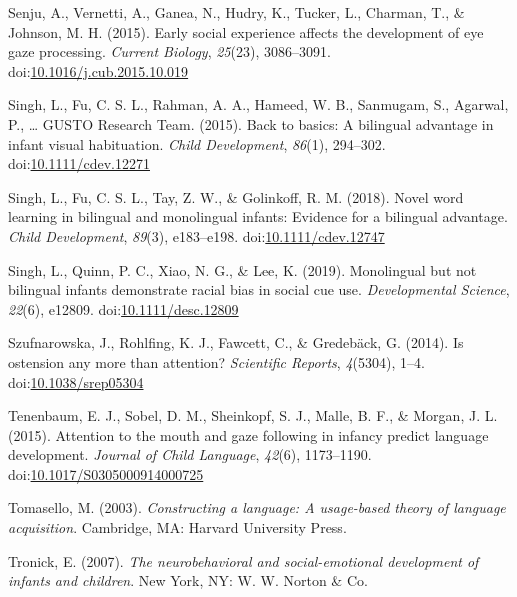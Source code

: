 \documentclass[,man,floatsintext]{apa6}
\begin{document}
\leavevmode\hypertarget{ref-Senju_etal_2015}{}%
Senju, A., Vernetti, A., Ganea, N., Hudry, K., Tucker, L., Charman, T., \& Johnson, M. H. (2015). Early social experience affects the development of eye gaze processing. \emph{Current Biology}, \emph{25}(23), 3086--3091. doi:\href{https://doi.org/10.1016/j.cub.2015.10.019}{10.1016/j.cub.2015.10.019}

\leavevmode\hypertarget{ref-Singh_etal_2015}{}%
Singh, L., Fu, C. S. L., Rahman, A. A., Hameed, W. B., Sanmugam, S., Agarwal, P., \ldots{} GUSTO Research Team. (2015). Back to basics: A bilingual advantage in infant visual habituation. \emph{Child Development}, \emph{86}(1), 294--302. doi:\href{https://doi.org/10.1111/cdev.12271}{10.1111/cdev.12271}

\leavevmode\hypertarget{ref-Singh_etal_2018}{}%
Singh, L., Fu, C. S. L., Tay, Z. W., \& Golinkoff, R. M. (2018). Novel word learning in bilingual and monolingual infants: Evidence for a bilingual advantage. \emph{Child Development}, \emph{89}(3), e183--e198. doi:\href{https://doi.org/10.1111/cdev.12747}{10.1111/cdev.12747}

\leavevmode\hypertarget{ref-Singh_etal_2019}{}%
Singh, L., Quinn, P. C., Xiao, N. G., \& Lee, K. (2019). Monolingual but not bilingual infants demonstrate racial bias in social cue use. \emph{Developmental Science}, \emph{22}(6), e12809. doi:\href{https://doi.org/10.1111/desc.12809}{10.1111/desc.12809}

\leavevmode\hypertarget{ref-Szufnarowska_etal_2014}{}%
Szufnarowska, J., Rohlfing, K. J., Fawcett, C., \& Gredebäck, G. (2014). Is ostension any more than attention? \emph{Scientific Reports}, \emph{4}(5304), 1--4. doi:\href{https://doi.org/10.1038/srep05304}{10.1038/srep05304}

\leavevmode\hypertarget{ref-Tenenbaum_etal_2015}{}%
Tenenbaum, E. J., Sobel, D. M., Sheinkopf, S. J., Malle, B. F., \& Morgan, J. L. (2015). Attention to the mouth and gaze following in infancy predict language development. \emph{Journal of Child Language}, \emph{42}(6), 1173--1190. doi:\href{https://doi.org/10.1017/S0305000914000725}{10.1017/S0305000914000725}

\leavevmode\hypertarget{ref-Tomasello_2003}{}%
Tomasello, M. (2003). \emph{Constructing a language: A usage-based theory of language acquisition}. Cambridge, MA: Harvard University Press.

\leavevmode\hypertarget{ref-Tronick_2007}{}%
Tronick, E. (2007). \emph{The neurobehavioral and social-emotional development of infants and children}. New York, NY: W. W. Norton \& Co.
\end{document}
